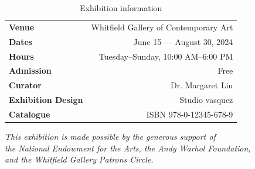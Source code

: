 \documentclass[
    language=english,
    doctype=art-catalogue,
    institution=none,
]{../../omnilatex}
\begin{document}
\begin{table}[h]
\centering
\begin{tabular}{lr}
\toprule
\textbf{Venue} & Whitfield Gallery of Contemporary Art \\
\textbf{Dates} & June 15 --- August 30, 2024 \\
\textbf{Hours} & Tuesday--Sunday, 10:00 AM--6:00 PM \\
\textbf{Admission} & Free \\
\textbf{Curator} & Dr. Margaret Liu \\
\textbf{Exhibition Design} & Studio vasquez \\
\textbf{Catalogue} & ISBN 978-0-12345-678-9 \\
\bottomrule
\end{tabular}
\caption{Exhibition information}
\end{table}

\vspace{1cm}

\begin{center}
\textit{This exhibition is made possible by the generous support of\\
the National Endowment for the Arts, the Andy Warhol Foundation,\\
and the Whitfield Gallery Patrons Circle.}
\end{center}
\end{document}
